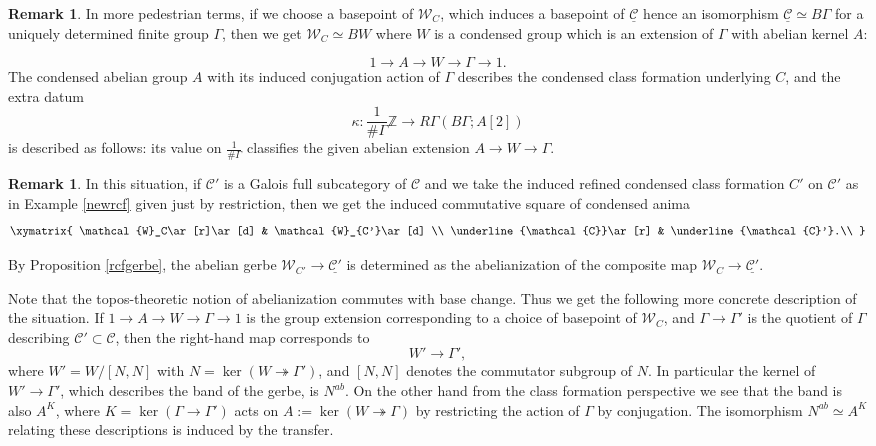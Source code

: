 \documentclass[12pt]{article}
\theoremstyle{definition}
\newtheorem{remark}[theorem]{Remark}
\newcommand{\on}{\operatorname}
\newcommand{\mc}{\mathcal}
\newcommand{\mbb}{\mathbb}
\newcommand{\ul}{\underline}
\begin{document}
\begin{remark}\label{groupextension}
In more pedestrian terms, if we choose a basepoint of $\mc{W}_C$, which induces a basepoint of $\ul{\mc{C}}$ hence an isomorphism $\ul{\mc{C}}\simeq B\Gamma$ for a uniquely determined finite group $\Gamma$, then we get $\mc{W}_C\simeq BW$ where $W$ is a condensed group which is an extension of $\Gamma$ with abelian kernel $A$:

$$1 \to A \to W \to \Gamma \to 1.$$
The condensed abelian group $A$ with its induced conjugation action of $\Gamma$ describes the condensed class formation underlying $C$, and the extra datum
$$\kappa: \frac{1}{\#\Gamma}\mbb{Z} \to R\Gamma(B\Gamma;A[2])$$
is described as follows: its value on $\frac{1}{\#\Gamma}$ classifies the given abelian extension $A \to W \to \Gamma$.
\end{remark}

\begin{remark}\label{groupextensiontransition}
In this situation, if $\mc{C}'$ is a Galois full subcategory of $\mc{C}$ and we take the induced refined condensed class formation $C'$ on $\mc{C}'$ as in Example \ref{newrcf} given just by restriction, then we get the induced commutative square of condensed anima
$$\xymatrix{
\mc{W}_C\ar[r]\ar[d] & \mc{W}_{C'}\ar[d] \\
\ul{\mc{C}}\ar[r] & \ul{\mc{C}'}.\\ }$$

\noindent By Proposition \ref{rcfgerbe}, the abelian gerbe $\mc{W}_{C'}\to\ul{\mc{C}'}$ is determined as the abelianization of the composite map $\mc{W}_C \to \ul{\mc{C}'}$.

Note that the topos-theoretic notion of abelianization commutes with base change.  Thus we get the following more concrete description of the situation. If $1 \to A \to W \to \Gamma \to 1$ is the group extension corresponding to a choice of basepoint of $\mc{W}_C$, and $\Gamma\to\Gamma'$ is the quotient of $\Gamma$ describing $\mc{C}'\subset\mc{C}$, then the right-hand map corresponds to
$$W' \to \Gamma',$$
where $W' = W/[N,N]$ with $N=\on{ker}(W\twoheadrightarrow \Gamma')$, and $[N,N]$ denotes the commutator subgroup of $N$.  In particular the kernel of $W'\to \Gamma'$, which describes the band of the gerbe, is $N^{ab}$.  On the other hand from the class formation perspective we see that the band is also $A^K$, where $K=\on{ker}(\Gamma\to\Gamma')$ acts on $A:=\on{ker}(W\twoheadrightarrow\Gamma)$ by restricting the action of $\Gamma$ by conjugation.  The isomorphism $N^{ab}\simeq A^K$ relating these descriptions is induced by the transfer.
\end{remark}
\end{document}
